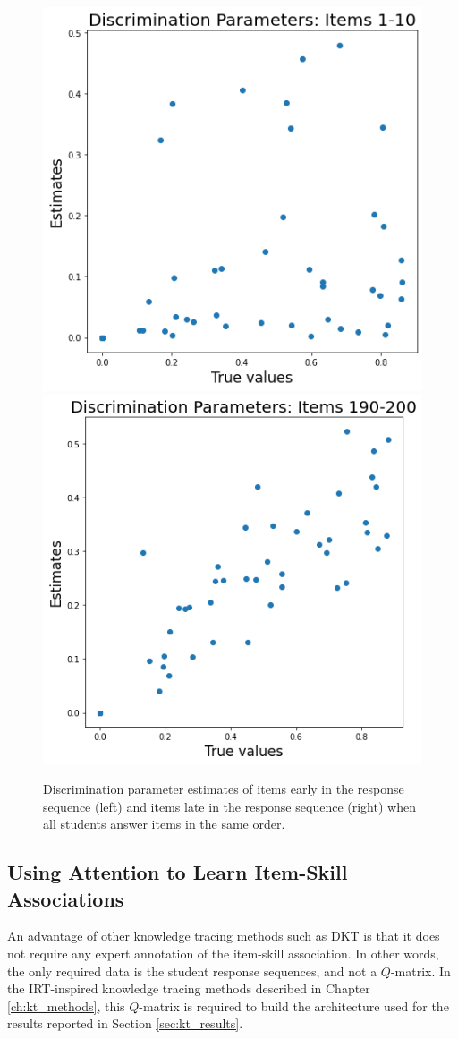 \begin{figure}[h]
  \centering
  \includegraphics[width=.8\textwidth]{img/kt_irt/disc_est_no_shuffle_early.png}
  \endminipage
  \includegraphics[width=.8\textwidth]{img/kt_irt/disc_est_no_shuffle_late.png}
  \endminipage
  \caption{Discrimination parameter estimates of items early in the response sequence (left) and items late in the response sequence (right) when all students answer items in the same order.}
  \label{fig:no_shuffle}
\end{figure}

\subsection{Using Attention to Learn Item-Skill Associations}
An advantage of other knowledge tracing methods such as DKT is that it does not require any expert annotation of the item-skill association. In other words, the only required data is the student response sequences, and not a $Q$-matrix. In the IRT-inspired knowledge tracing methods described in Chapter \ref{ch:kt_methods}, this $Q$-matrix is required to build the architecture used for the results reported in Section \ref{sec:kt_results}.

